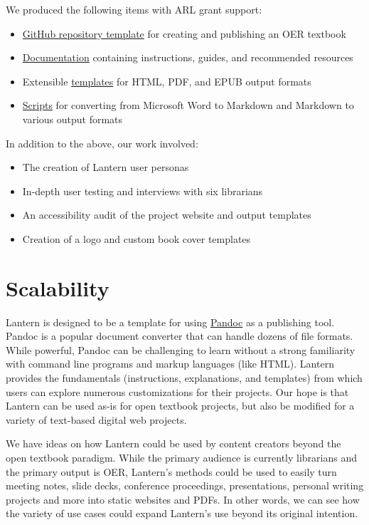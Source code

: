 \documentclass[
  11pt,
  openany]{book}
\providecommand{\tightlist}{%
  \setlength{\itemsep}{0pt}\setlength{\parskip}{0pt}}
\begin{document}
We produced the following items with ARL grant support:

\begin{itemize}
\tightlist
\item
  \href{https://github.com/nulib-oer/lantern}{GitHub repository template} for
  creating and publishing an OER textbook
\item
  \href{https://github.com/nulib-oer/lantern/wiki/}{Documentation} containing
  instructions, guides, and recommended resources
\item
  Extensible
  \href{https://github.com/nulib-oer/lantern/tree/main/templates}{templates}
  for HTML, PDF, and EPUB output formats
\item
  \href{https://github.com/nulib-oer/lantern/blob/main/lantern.sh}{Scripts}
  for converting from Microsoft Word to Markdown and Markdown to various
  output formats
\end{itemize}

In addition to the above, our work involved:

\begin{itemize}
\tightlist
\item
  The creation of Lantern user personas
\item
  In-depth user testing and interviews with six librarians
\item
  An accessibility audit of the project website and output templates
\item
  Creation of a logo and custom book cover templates
\end{itemize}

\hypertarget{scalability}{%
\section{Scalability}\label{scalability}}

Lantern is designed to be a template for using
\href{https://pandoc.org/}{Pandoc} as a publishing tool. Pandoc is a popular
document converter that can handle dozens of file formats. While powerful,
Pandoc can be challenging to learn without a strong familiarity with command
line programs and markup languages (like HTML). Lantern provides the
fundamentals (instructions, explanations, and templates) from which users can
explore numerous customizations for their projects. Our hope is that Lantern
can be used as-is for open textbook projects, but also be modified for a
variety of text-based digital web projects.

We have ideas on how Lantern could be used by content creators beyond the open
textbook paradigm. While the primary audience is currently librarians and the
primary output is OER, Lantern's methods could be used to easily turn meeting
notes, slide decks, conference proceedings, presentations, personal writing
projects and more into static websites and PDFs. In other words, we can see
how the variety of use cases could expand Lantern's use beyond its original
intention.
\end{document}
